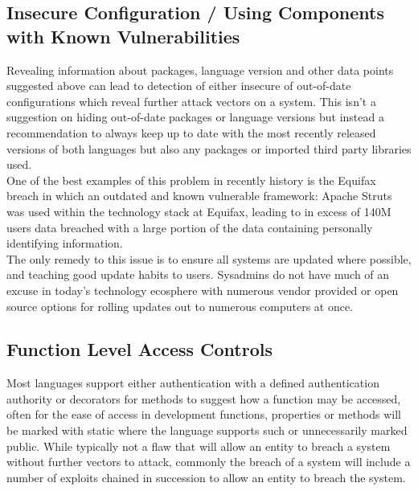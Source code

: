 \documentclass{IEEEtran}
\begin{document}
        \subsection{Insecure Configuration / Using Components with Known Vulnerabilities}
            Revealing information about packages, language version and other data points suggested above can lead 
            to detection of either insecure of out-of-date configurations 
            which reveal further attack vectors on a system. This isn't a suggestion on hiding 
            out-of-date packages or language versions but instead a recommendation to always keep
            up to date with the most recently released versions of both languages but also any 
            packages or imported third party libraries used.
            \medskip
            \\
            One of the best examples of this problem in recently history is the Equifax breach in which an 
            outdated and known vulnerable framework: Apache Struts was used within the technology stack at
            Equifax\cite{Equifax-Breach}, leading to in excess of 140M users data breached with a large portion 
            of the data containing personally identifying information.
            \\
            The only remedy to this issue is to ensure all systems are updated where possible, and teaching good 
            update habits to users. Sysadmins do not have much of an excuse in today's technology ecosphere with 
            numerous vendor provided or open source options for rolling updates out to numerous computers at once.

        \subsection{Function Level Access Controls}
            Most languages support either authentication with a defined authentication authority or decorators 
            for methods to suggest how a function may be accessed, often for the ease of access in development 
            functions, properties or methods will be marked with static where the language supports such or 
            unnecessarily marked public. While typically not a flaw that will allow an entity to breach a system without 
            further vectors to attack, commonly the breach of a system will include a number of exploits chained 
            in succession to allow an entity to breach the system.
            \medskip
            \\
\end{document}
